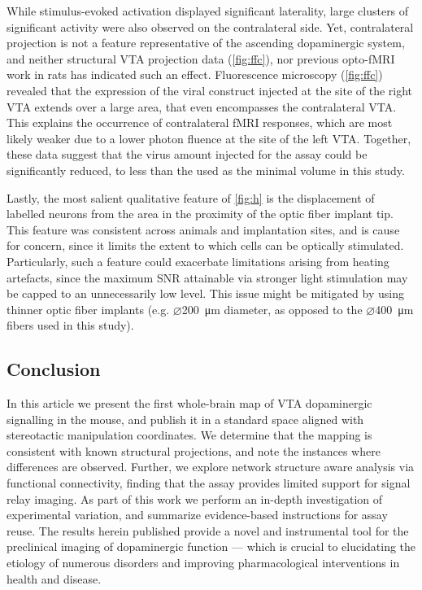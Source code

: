 While stimulus-evoked activation displayed significant laterality, large clusters of significant activity were also observed on the contralateral side.
Yet, contralateral projection is not a feature representative of the ascending dopaminergic system, and neither structural VTA projection data (\cref{fig:ffc}), nor previous opto-fMRI work in rats \cite{Lohani2016} has indicated such an effect.
Fluorescence microscopy (\cref{fig:ffc}) revealed that the expression of the viral construct injected at the site of the right VTA extends over a large area, that even encompasses the contralateral VTA.
This explains the occurrence of contralateral fMRI responses, which are most likely weaker due to a lower photon fluence at the site of the left VTA.
Together, these data suggest that the virus amount injected for the assay could be significantly reduced, to less than the
used as the minimal volume in this study.

Lastly, the most salient qualitative feature of \cref{fig:h} is the displacement of labelled neurons from the area in the proximity of the optic fiber implant tip.
This feature was consistent across animals and implantation sites, and is cause for concern, since it limits the extent to which cells can be optically stimulated.
Particularly, such a feature could exacerbate limitations arising from heating artefacts, since the maximum SNR attainable via stronger light stimulation may be capped to an unnecessarily low level.
This issue might be mitigated by using thinner optic fiber implants (e.g. $\diameter$\SI{200}{\micro\meter} diameter, as opposed to the $\diameter$\SI{400}{\micro\meter} fibers used in this study).

\subsection{Conclusion}

In this article we present the first whole-brain map of VTA dopaminergic signalling in the mouse, and publish it in a standard space aligned with stereotactic manipulation coordinates.
We determine that the mapping is consistent with known structural projections, and note the instances where differences are observed.
Further, we explore network structure aware analysis via functional connectivity, finding that the assay provides limited support for signal relay imaging.
As part of this work we perform an in-depth investigation of experimental variation, and summarize evidence-based instructions for assay reuse.
The results herein published provide a novel and instrumental tool for the preclinical imaging of dopaminergic function --- which is crucial to elucidating the etiology of numerous disorders and improving pharmacological interventions in health and disease.

